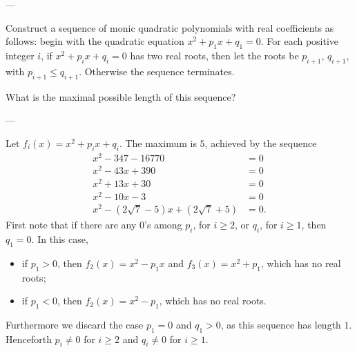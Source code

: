 
---

Construct a sequence of monic quadratic polynomials with real coefficients as follows: begin with the quadratic equation $x^2+p_1x+q_1=0$. For each positive integer $i$, if $x^2+p_ix+q_i=0$ has two real roots, then let the roots be $p_{i+1}$, $q_{i+1}$, with $p_{i+1}\le q_{i+1}$. Otherwise the sequence terminates.

What is the maximal possible length of this sequence?

---

Let $f_i(x)=x^2+p_ix+q_i$. The maximum is $5$, achieved by the sequence
\begin{align*}
    x^2-347-16770&=0\\
    x^2-43x+390&=0\\
    x^2+13x+30&=0\\
    x^2-10x-3&=0\\
    x^2-(2\sqrt7-5)x+(2\sqrt7+5)&=0.
\end{align*}
First note that if there are any $0$'s among $p_i$, for $i\ge2$, or $q_i$, for $i\ge1$, then $q_1=0$. In this case,
\begin{itemize}[itemsep=0em]
    \item if $p_1>0$, then $f_2(x)=x^2-p_1x$ and $f_3(x)=x^2+p_1$, which has no real roots;
    \item if $p_1<0$, then $f_2(x)=x^2-p_1$, which has no real roots.
\end{itemize}
Furthermore we discard the case $p_1=0$ and $q_1>0$, as this sequence has length $1$. Henceforth $p_i\ne0$ for $i\ge2$ and $q_i\ne0$ for $i\ge1$.

